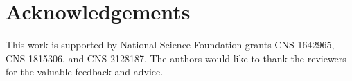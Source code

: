 \section*{Acknowledgements}
This work is supported by National Science Foundation grants CNS-1642965, CNS-1815306, and CNS-2128187. 
The authors would like to thank the reviewers for the valuable feedback and advice.